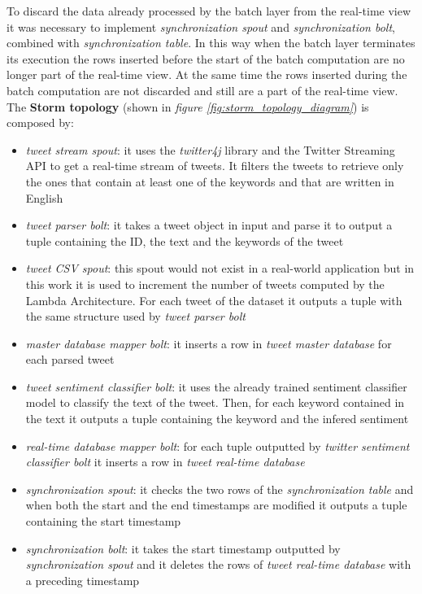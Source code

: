 \documentclass[10pt,twocolumn,letterpaper]{article}
\begin{document}
To discard the data already processed by the batch layer from the real-time view it was necessary to implement \emph{synchronization spout} and \emph{synchronization bolt}, combined with \emph{synchronization table}. In this way when the batch layer terminates its execution the rows inserted before the start of the batch computation are no longer part of the real-time view. At the same time the rows inserted during the batch computation are not discarded and still are a part of the real-time view. The \textbf{Storm topology} (shown in \emph{figure \ref{fig:storm_topology_diagram}}) is composed by:
\begin{itemize}
\item \emph{tweet stream spout}: it uses the \emph{twitter4j} library and the Twitter Streaming API to get a real-time stream of tweets. It filters the tweets to retrieve only the ones that contain at least one of the keywords and that are written in English
\item \emph{tweet parser bolt}: it takes a tweet object in input and parse it to output a tuple containing the ID, the text and the keywords of the tweet
\item \emph{tweet CSV spout}: this spout would not exist in a real-world application but in this work it is used to increment the number of tweets computed by the Lambda Architecture. For each tweet of the dataset \cite{guyzGithubDataset} it outputs a tuple with the same structure used by \emph{tweet parser bolt}
\item \emph{master database mapper bolt}: it inserts a row in \emph{tweet master database} for each parsed tweet
\item \emph{tweet sentiment classifier bolt}: it uses the already trained sentiment classifier model to classify the text of the tweet. Then, for each keyword contained in the text it outputs a tuple containing the keyword and the infered sentiment
\item \emph{real-time database mapper bolt}: for each tuple outputted by \emph{twitter sentiment classifier bolt} it inserts a row in \emph{tweet real-time database}
\item \emph{synchronization spout}: it checks the two rows of the \emph{synchronization table} and when both the start and the end timestamps are modified it outputs a tuple containing the start timestamp
\item \emph{synchronization bolt}: it takes the start timestamp outputted by \emph{synchronization spout} and it deletes the rows of \emph{tweet real-time database} with a preceding timestamp
\end{itemize}
\end{document}
